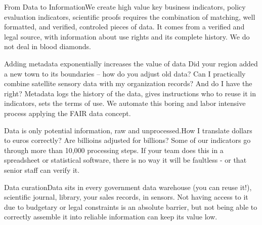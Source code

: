 \documentclass[
  a4paper,
  openany, a4paper, oneside]{book}
\begin{document}
From Data to InformationWe create high value key business indicators, policy evaluation indicators, scientific proofs requires the combination of matching, well formatted, and verified, controled pieces of data. It comes from a verified and legal source, with information about use rights and its complete history. We do not deal in blood diamonds.

Adding metadata exponentially increases the value of data Did your region added a new town to its boundaries -- how do you adjust old data? Can I practically combine satellite sensory data with my organization records? And do I have the right? Metadata logs the history of the data, gives instructions who to reuse it in indicators, sets the terms of use. We automate this boring and labor intensive process applying the FAIR data concept.

Data is only potential information, raw and unprocessed.How I translate dollars to euros correctly? Are billioins adjusted for billions? Some of our indicators go through more than 10,000 processing steps. If your team does this in a spreadsheet or statistical software, there is no way it will be faultless - or that senior staff can verify it.

Data curationData sits in every government data warehouse (you can reuse it!), scientific journal, library, your sales records, in sensors. Not having access to it due to budgetary or legal constraints is an absolute barrier, but not being able to correctly assemble it into reliable information can keep its value low.
\end{document}
